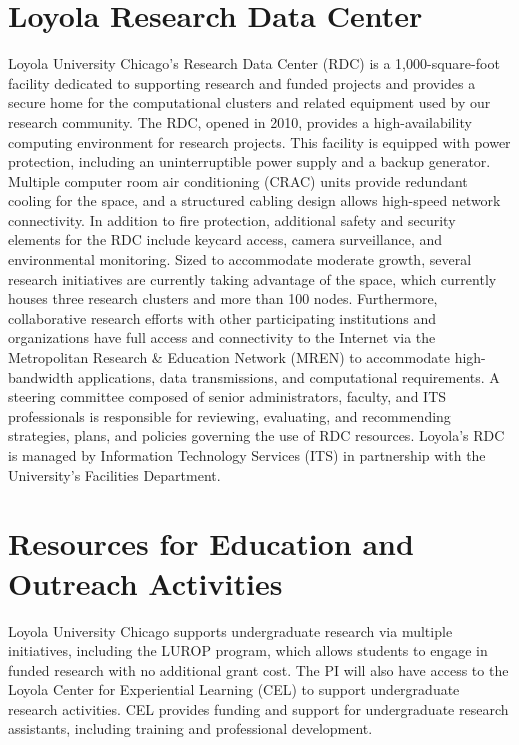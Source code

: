 \section{Loyola Research Data Center}

Loyola University Chicago's Research Data Center (RDC) is a 1,000-square-foot facility dedicated to supporting research and funded projects and provides a secure home for the computational clusters and related equipment used by our research community.
The RDC, opened in 2010, provides a high-availability computing environment for research projects. This facility is equipped with power protection, including an uninterruptible power supply and a backup generator. 
Multiple computer room air conditioning (CRAC) units provide redundant cooling for the space, and a structured cabling design allows high-speed network connectivity. In addition to fire protection, additional safety and security elements for the RDC include keycard access, camera surveillance, and environmental monitoring.
Sized to accommodate moderate growth, several research initiatives are currently taking advantage of the space, which currently houses three research clusters and more than 100 nodes. 
Furthermore, collaborative research efforts with other participating institutions and organizations have full access and connectivity to the Internet via the Metropolitan Research \& Education Network (MREN) to accommodate high-bandwidth applications, data transmissions, and computational requirements.
A steering committee composed of senior administrators, faculty, and ITS professionals is responsible for reviewing, evaluating, and recommending strategies, plans, and policies governing the use of RDC resources. Loyola's RDC is managed by Information Technology Services (ITS) in partnership with the University's Facilities Department.




\section{Resources for Education and Outreach Activities}
Loyola University Chicago supports undergraduate research via multiple initiatives, including the LUROP program, which allows students to engage in funded research with no additional grant cost.
The PI will also have access to the Loyola Center for Experiential Learning (CEL) to support undergraduate research activities. CEL provides funding and support for undergraduate research assistants, including training and professional development.

